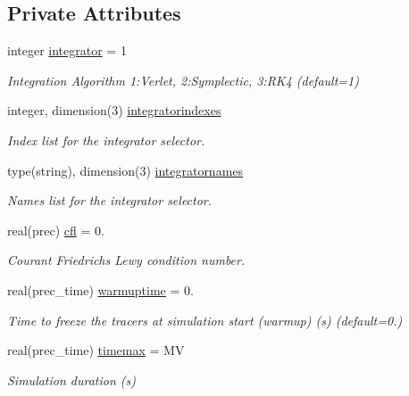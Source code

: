 \subsection*{Private Attributes}
\begin{DoxyCompactItemize}
\item 
integer \mbox{\hyperlink{structsimulation__globals__mod_1_1parameters__t_a4e57d5a1897acaf67eb14e39e3e0cf21}{integrator}} = 1
\begin{DoxyCompactList}\small\item\em Integration Algorithm 1\+:Verlet, 2\+:Symplectic, 3\+:R\+K4 (default=1) \end{DoxyCompactList}\item 
integer, dimension(3) \mbox{\hyperlink{structsimulation__globals__mod_1_1parameters__t_a939ab06e51a63cb7d521b5476e51b816}{integratorindexes}}
\begin{DoxyCompactList}\small\item\em Index list for the integrator selector. \end{DoxyCompactList}\item 
type(string), dimension(3) \mbox{\hyperlink{structsimulation__globals__mod_1_1parameters__t_a3115dcd5d6ea05501730adc71bc26b57}{integratornames}}
\begin{DoxyCompactList}\small\item\em Names list for the integrator selector. \end{DoxyCompactList}\item 
real(prec) \mbox{\hyperlink{structsimulation__globals__mod_1_1parameters__t_a63d8108183b786ec9acf16af2164bda1}{cfl}} = 0.
\begin{DoxyCompactList}\small\item\em Courant Friedrichs Lewy condition number. \end{DoxyCompactList}\item 
real(prec\+\_\+time) \mbox{\hyperlink{structsimulation__globals__mod_1_1parameters__t_aff3f4d5714c5a91daaad20aacf63f0a5}{warmuptime}} = 0.
\begin{DoxyCompactList}\small\item\em Time to freeze the tracers at simulation start (warmup) (s) (default=0.) \end{DoxyCompactList}\item 
real(prec\+\_\+time) \mbox{\hyperlink{structsimulation__globals__mod_1_1parameters__t_ad56e8a5217faee90d48d0811a36cce32}{timemax}} = MV
\begin{DoxyCompactList}\small\item\em Simulation duration (s) \end{DoxyCompactList}\item 

\end{DoxyCompactItemize}
